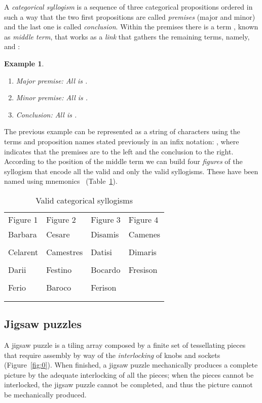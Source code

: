 \documentclass[a4paper,UKenglish]{lipics}
\newtheorem {myexample}{Example}
\begin{document}
A \textit{categorical syllogism} is a sequence of three categorical propositions ordered in such a way that the two first propositions are called \textit{premises} (major and minor) and the last one is called \textit{conclusion}. Within the premises there is a term , known as \textit{middle term}, that works as a \textit{link} that gathers the remaining terms, namely,  and :

\begin{myexample}\text{}
\begin{enumerate}
	\item Major premise: \textit{All}  \textit{is} .
	\item Minor premise: \textit{All}  \textit{is} .
	\item Conclusion: \textit{All}  \textit{is} .
\end{enumerate}
\end{myexample}


The previous example can be represented as a string of characters using the terms and proposition names stated previously in an infix notation: , where  indicates that the premises are to the left and the conclusion to the right. According to the position of the middle term  we can build four \textit{figures} of the syllogism that encode all the valid and only the valid syllogisms. These have been named using mnemonics~\cite{PETEROFSPAIN} (Table~\ref{tab:1}).

\begin{table}[h]
\caption{Valid categorical syllogisms}
\label{tab:1}      
\begin{tabular}{llll}
\hline\noalign{\smallskip}
Figure 1 & Figure 2 & Figure 3 & Figure 4 \\
\noalign{\smallskip}\hline\noalign{\smallskip}
Barbara 		  & Cesare 			& Disamis 		    & Camenes 			\\
 &  &  &  \\
Celarent 		  & Camestres 			& Datisi 		    & Dimaris 			\\
 & &  &  \\
Darii 			  & Festino 			& Bocardo 		    & Fresison 			\\ 
 &  &  &  \\
Ferio 			  & Baroco  			& Ferison 		    &        			\\  
 &  &  & 				\\
\noalign{\smallskip}\hline
\end{tabular}
\end{table} 

\subsection{Jigsaw puzzles}
A jigsaw puzzle is a tiling array composed by a finite set of tessellating pieces that require assembly by way of the \textit{interlocking} of knobs and sockets (Figure~\ref{fig:0}). When finished, a jigsaw puzzle mechanically produces a complete picture by the adequate interlocking of all the pieces; when the pieces cannot be interlocked, the jigsaw puzzle cannot be completed, and thus the picture cannot be mechanically produced.
\end{document}
